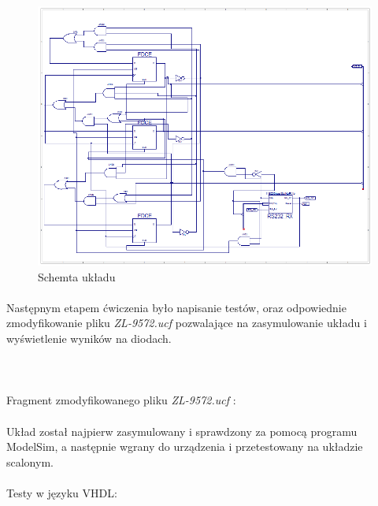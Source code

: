 \documentclass[wide,a4paper,titlepage,12pt] {article}
\begin{document}
	\begin{figure}[htbp]
	 		\begin{center}
         \includegraphics[scale=0.7]{Capture.PNG}
      \caption{Schemta układu}
     \end{center}
  \end{figure}

  \paragraph{}
  Następnym etapem ćwiczenia było napisanie testów, oraz odpowiednie zmodyfikowanie pliku \textit{ZL-9572.ucf} pozwalające na zasymulowanie układu i wyświetlenie wyników na diodach.
	\\ \\ \\
	\paragraph{}
	Fragment zmodyfikowanego pliku \textit{ZL-9572.ucf} :
	

	\paragraph{}
	Układ został najpierw zasymulowany i sprawdzony za pomocą programu ModelSim, a następnie wgrany do urządzenia i przetestowany na układzie scalonym.

		\paragraph{}
	Testy w języku VHDL:
	
\end{document}
